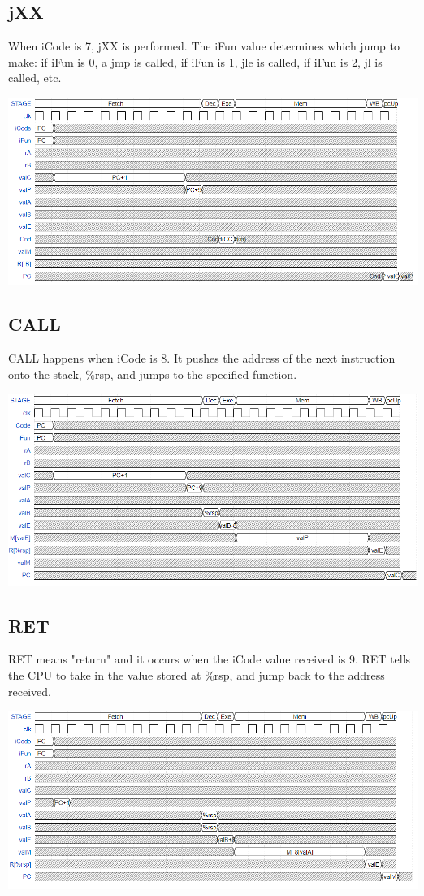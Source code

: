 \documentclass{article}
\begin{document}
\subsection{jXX}
When iCode is 7, jXX is performed. The iFun value determines which jump to make: if iFun is 0, a jmp is called, if iFun is 1, jle is called, if iFun is 2, jl is called, etc. 
\begin{center}
    \includegraphics[scale=.6]{jXXpic.png}
\end{center}
\pagebreak
\subsection{CALL}
CALL happens when iCode is 8. It pushes the address of the next instruction onto the stack, \%rsp, and jumps to the specified function. 
\begin{center}
    \includegraphics[scale=.6]{cALLpic.png}
\end{center}
\subsection{RET}
RET means "return" and it occurs when the iCode value received is 9. RET tells the CPU to take in the value stored at \%rsp, and jump back to the address received. 
\begin{center}
    \includegraphics[scale=.6]{RETpic.png}
\end{center}
\pagebreak
\end{document}
